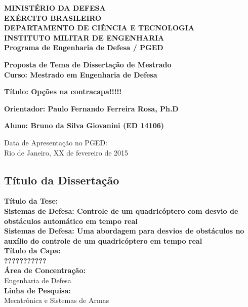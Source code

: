 \documentclass[a4paper, 12pt]{article}
\author{Seu nome}
\title{}
\begin{document}
\begin{center}
\textbf{MINISTÉRIO DA DEFESA}\\
\textbf{EXÉRCITO BRASILEIRO}\\
\textbf{DEPARTAMENTO DE CIÊNCIA E TECNOLOGIA}\\
\textbf{INSTITUTO MILITAR DE ENGENHARIA}\\
\textbf{Programa de Engenharia de Defesa / PGED}

\vspace{2.5cm}

\begin{large}
\textbf{Proposta de Tema de Dissertação de Mestrado
\\Curso: Mestrado em Engenharia de Defesa}

\vspace{1.5cm}

\textbf{Título: Opções na contracapa!!!!!}

\vspace{1.5cm}


\textbf{Orientador: Paulo Fernando Ferreira Rosa, Ph.D}

\end{large}

\vspace{1.5cm}

\textbf{Aluno: Bruno da Silva Giovanini (ED 14106)}


\vspace{2cm}

\begin{small}
Data de Apresentação no PGED:\\
Rio de Janeiro, XX de fevereiro de 2015
\end{small}

\end{center}


\newpage
\begin{large}
\section*{Título da Dissertação}
\textbf{Título da Tese:}\\
\textbf{Sistemas de Defesa: Controle de um quadricóptero com desvio de obstáculos automático em tempo real}\\

\noindent\textbf{Sistemas de Defesa: Uma abordagem para desvios de obstáculos no auxílio do controle de um quadricóptero em tempo real}\\
 

\noindent\textbf{Título da Capa:}\\
\textbf{???????????}\\

\noindent\textbf{Área de Concentração:}\\
Engenharia de Defesa\\

\noindent\textbf{Linha de Pesquisa:}\\
Mecatrônica e Sistemas de Armas\\
\end{large}
\end{document}
